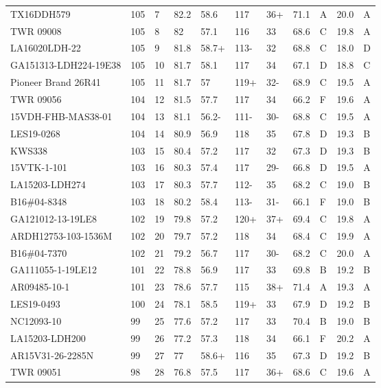 \documentclass[12pt, letterpaper]{article}
\begin{document}
\begin{landscape}
\begin{ThreePartTable}
\begin{longtable}{lllllllllll}
  TX16DDH579 & 105 &  7 & 82.2 & 58.6 & 117 & 36+ & 71.1 & A & 20.0 & A \\ 
  TWR 09008 & 105 &  8 & 82 & 57.1 & 116 & 33 & 68.6 & C & 19.8 & A \\ 
  LA16020LDH-22 & 105 &  9 & 81.8 & 58.7+ & 113- & 32 & 68.8 & C & 18.0 & D \\ 
  GA151313-LDH224-19E38 & 105 & 10 & 81.7 & 58.1 & 117 & 34 & 67.1 & D & 18.8 & C \\ 
  Pioneer Brand 26R41 & 105 & 11 & 81.7 & 57 & 119+ & 32- & 68.9 & C & 19.5 & A \\ 
  TWR 09056 & 104 & 12 & 81.5 & 57.7 & 117 & 34 & 66.2 & F & 19.6 & A \\ 
  15VDH-FHB-MAS38-01 & 104 & 13 & 81.1 & 56.2- & 111- & 30- & 68.8 & C & 19.5 & A \\ 
  LES19-0268 & 104 & 14 & 80.9 & 56.9 & 118 & 35 & 67.8 & D & 19.3 & B \\ 
  KWS338 & 103 & 15 & 80.4 & 57.2 & 117 & 32 & 67.3 & D & 19.3 & B \\ 
  15VTK-1-101 & 103 & 16 & 80.3 & 57.4 & 117 & 29- & 66.8 & D & 19.5 & A \\ 
  LA15203-LDH274 & 103 & 17 & 80.3 & 57.7 & 112- & 35 & 68.2 & C & 19.0 & B \\ 
  B16\#04-8348 & 103 & 18 & 80.2 & 58.4 & 113- & 31- & 66.1 & F & 19.0 & B \\ 
  GA121012-13-19LE8 & 102 & 19 & 79.8 & 57.2 & 120+ & 37+ & 69.4 & C & 19.8 & A \\ 
  ARDH12753-103-1536M & 102 & 20 & 79.7 & 57.2 & 118 & 34 & 68.4 & C & 19.9 & A \\ 
  B16\#04-7370 & 102 & 21 & 79.2 & 56.7 & 117 & 30- & 68.2 & C & 20.0 & A \\ 
  GA111055-1-19LE12 & 101 & 22 & 78.8 & 56.9 & 117 & 33 & 69.8 & B & 19.2 & B \\ 
  AR09485-10-1 & 101 & 23 & 78.6 & 57.7 & 115 & 38+ & 71.4 & A & 19.3 & A \\ 
  LES19-0493 & 100 & 24 & 78.1 & 58.5 & 119+ & 33 & 67.9 & D & 19.2 & B \\ 
  NC12093-10 &  99 & 25 & 77.6 & 57.2 & 117 & 33 & 70.4 & B & 19.0 & B \\ 
  LA15203-LDH200 &  99 & 26 & 77.2 & 57.3 & 118 & 34 & 66.1 & F & 20.2 & A \\ 
  AR15V31-26-2285N &  99 & 27 & 77 & 58.6+ & 116 & 35 & 67.3 & D & 19.2 & B \\ 
  TWR 09051 &  98 & 28 & 76.8 & 57.5 & 117 & 36+ & 68.6 & C & 19.6 & A \\ 

\end{longtable}
\end{ThreePartTable}
\end{landscape}
\end{document}
